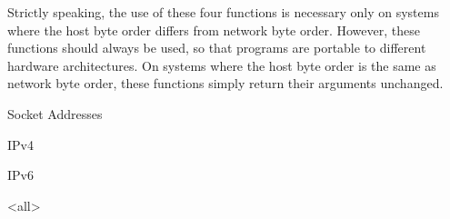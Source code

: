 Strictly speaking, the use of these four functions is necessary only on systems where the
host byte order differs from network byte order. However, these functions should always
be used, so that programs are portable to different hardware architectures. On systems
where the host byte order is the same as network byte order, these functions simply return
their arguments unchanged. 

\begin{frame}{Socket Addresses}
  \begin{block}{IPv4}
    \begin{center}
    \end{center}
  \end{block}
  \begin{block}{IPv6}
    \begin{center}
    \end{center}
  \end{block}
\end{frame}


\mode<all>
